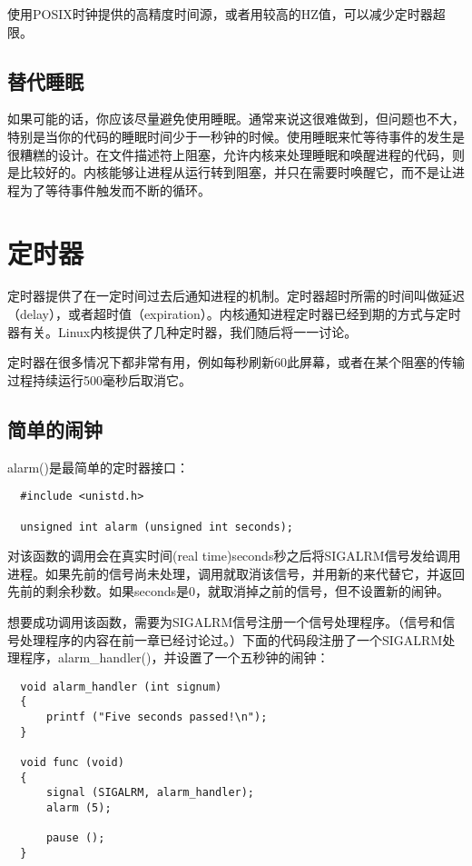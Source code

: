 使用POSIX时钟提供的高精度时间源，或者用较高的HZ值，可以减少定时器超限。 

\subsection{替代睡眠}

如果可能的话，你应该尽量避免使用睡眠。通常来说这很难做到，但问题也不大，特别是当你的代码的睡眠时间少于一秒钟的时候。使用睡眠来忙等待事件的发生是很糟糕的设计。在文件描述符上阻塞，允许内核来处理睡眠和唤醒进程的代码，则是比较好的。内核能够让进程从运行转到阻塞，并只在需要时唤醒它，而不是让进程为了等待事件触发而不断的循环。 

\section{定时器}

定时器提供了在一定时间过去后通知进程的机制。定时器超时所需的时间叫做延迟（delay），或者超时值（expiration）。内核通知进程定时器已经到期的方式与定时器有关。Linux内核提供了几种定时器，我们随后将一一讨论。 

定时器在很多情况下都非常有用，例如每秒刷新60此屏幕，或者在某个阻塞的传输过程持续运行500毫秒后取消它。

\subsection{简单的闹钟}

alarm()是最简单的定时器接口： 

\begin{lstlisting}
  #include <unistd.h>

  unsigned int alarm (unsigned int seconds);
\end{lstlisting}

对该函数的调用会在真实时间(real time)seconds秒之后将SIGALRM信号发给调用进程。如果先前的信号尚未处理，调用就取消该信号，并用新的来代替它，并返回先前的剩余秒数。如果seconds是0，就取消掉之前的信号，但不设置新的闹钟。 

想要成功调用该函数，需要为SIGALRM信号注册一个信号处理程序。（信号和信号处理程序的内容在前一章已经讨论过。）下面的代码段注册了一个SIGALRM处理程序，alarm\_handler()，并设置了一个五秒钟的闹钟： 

\begin{lstlisting}
  void alarm_handler (int signum)
  {
      printf ("Five seconds passed!\n");
  }

  void func (void)
  {
      signal (SIGALRM, alarm_handler);
      alarm (5);

      pause ();
  }
\end{lstlisting}

